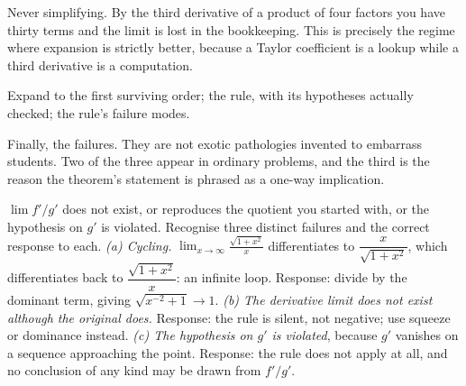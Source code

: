\begin{trap}
Never simplifying. By the third derivative of a product of four factors you have thirty terms and the limit is lost in the bookkeeping. This is precisely the regime where expansion is strictly better, because a Taylor coefficient is a lookup while a third derivative is a computation.
\end{trap}

\begin{seealsob}Expand to the first surviving order; the rule, with its hypotheses actually checked; the rule's failure modes.\end{seealsob}

Finally, the failures. They are not exotic pathologies invented to embarrass students. Two of the three appear in ordinary problems, and the third is the reason the theorem's statement is phrased as a one-way implication.

\cue $\lim f'/g'$ does not exist, or reproduces the quotient you started with, or the hypothesis on $g'$ is violated.
\method Recognise three distinct failures and the correct response to each.
\emph{(a) Cycling.} $\displaystyle\lim_{x\to\infty}\frac{\sqrt{1+x^{2}}}{x}$ differentiates to $\dfrac{x}{\sqrt{1+x^{2}}}$, which differentiates back to $\dfrac{\sqrt{1+x^{2}}}{x}$: an infinite loop. Response: divide by the dominant term, giving $\sqrt{x^{-2}+1}\to1$.
\emph{(b) The derivative limit does not exist although the original does.} Response: the rule is silent, not negative; use squeeze or dominance instead.
\emph{(c) The hypothesis on $g'$ is violated}, because $g'$ vanishes on a sequence approaching the point. Response: the rule does not apply at all, and no conclusion of any kind may be drawn from $f'/g'$.

